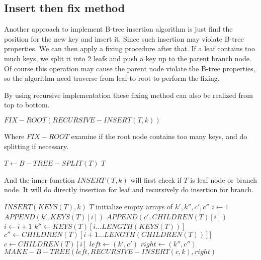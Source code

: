 \documentclass{article}
\begin{document}
\subsection{Insert then fix method}
Another approach to implement B-tree insertion algorithm is just find
the position for the new key and insert it. Since such insertion may
violate B-tree properties. We can then apply a fixing procedure after
that. If a leaf contains too much keys, we split it into 2 leafs and
push a key up to the parent branch node. Of course this operation
may cause the parent node violate the B-tree properties, so the
algorithm need traverse from leaf to root to perform the fixing.

By using recursive implementation these fixing method can also be
realized from top to bottom.

\begin{algorithmic}[1]
  \State \Return $FIX-ROOT(RECURSIVE-INSERT(T, k))$
\EndFunction
\end{algorithmic}

Where $FIX-ROOT$ examine if the root node contains too many keys,
and do splitting if necessary.

\begin{algorithmic}[1]
    \State $T \leftarrow B-TREE-SPLIT(T)$
  \EndIf
  \State \Return $T$
\EndFunction
\end{algorithmic}

And the inner function $INSERT(T, k)$ will first check if $T$
is leaf node or branch node. It will do directly insertion for leaf
and recursively do insertion for branch.

\begin{algorithmic}[1]
    \State $INSERT(KEYS(T), k)$
    \State \Return $T$
  \Else
    \State initialize empty arrays of $k', k'', c', c''$
    \State $i \leftarrow 1$
      \State $APPEND(k', KEYS(T)[i])$
      \State $APPEND(c', CHILDREN(T)[i])$
      \State $i \leftarrow i+1$
    \EndWhile
    \State $k'' \leftarrow KEYS(T)[i...LENGTH(KEYS(T))]$
    \State $c'' \leftarrow CHILDREN(T)[i+1...LENGTH(CHILDREN(T))]]$
    \State $c \leftarrow CHILDREN(T)[i]$
    \State $left \leftarrow (k', c')$
    \State $right \leftarrow (k'', c'')$
    \State \Return $MAKE-B-TREE(left, RECURSIVE-INSERT(c, k), right)$
  \EndIf
\EndFunction
\end{algorithmic}
\end{document}
